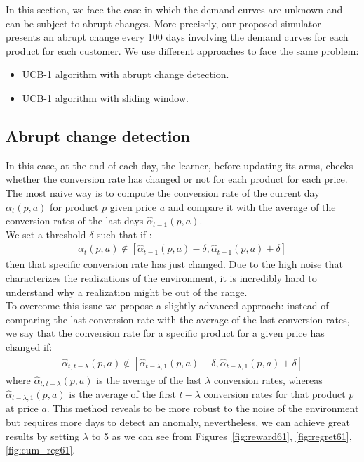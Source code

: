 In this section, we face the case in which the demand curves are unknown and can be subject to abrupt changes. More precisely, our proposed simulator presents an abrupt change every 100 days involving the demand curves for each product for each customer.
We use different approaches to face the same problem:
\begin{itemize}
    \item UCB-1 algorithm with abrupt change detection.
    \item UCB-1 algorithm with sliding window.
\end{itemize}
\subsection{Abrupt change detection}
\label{learner2}
In this case, at the end of each day, the learner, before updating its arms, checks whether the conversion rate has changed or not for each product for each price. The most naive way is to compute the conversion rate of the current day $\alpha_t(p, a)$ for product $p$ given price $a$ and compare it with the average of the conversion rates of the last days $\hat{\alpha}_{t-1}(p, a)$.\\ We set a threshold $\delta$ such that if :
\begin{align*}
        \alpha_t(p, a) \not\in \left[ \hat{\alpha}_{t-1}(p, a) - \delta, \hat{\alpha}_{t-1}(p, a) + \delta \right]
\end{align*}
then that specific conversion rate has just changed. Due to the high noise that characterizes the realizations of the environment, it is incredibly hard to understand why a realization might be out of the range.
\\ To overcome this issue we propose a slightly advanced approach: instead of comparing the last conversion rate with the average of the last conversion rates, we say that the conversion rate for a specific product for a given price has changed if:
\begin{align*}
    \hat{\alpha}_{t, t -\lambda}(p, a) \not\in \left[ \hat{\alpha}_{t-\lambda, 1}(p, a) - \delta, \hat{\alpha}_{t-\lambda, 1}(p, a) + \delta \right]
\end{align*}
where $\hat{\alpha}_{t, t -\lambda}(p, a)$ is the average of the last $\lambda$ conversion rates, whereas $ \hat{\alpha}_{t-\lambda, 1}(p, a)$ is the average of the first $t - \lambda$ conversion rates for that product $p$ at price $a$. This method reveals to be more robust to the noise of the environment but requires more days to detect an anomaly, nevertheless, we can achieve great results by setting $\lambda$ to 5 as we can see from Figures~\ref{fig:reward61}, \ref{fig:regret61}, \ref{fig:cum_reg61}.\\
